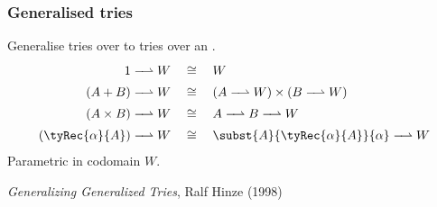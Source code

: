 \begin{frame}
\frametitle{Generalised tries}

Generalise tries over  to tries over an .
\begin{align*}
1 \toFin W
&\quad\cong\quad
W
\\
(A + B) \toFin W
&\quad\cong\quad
(A \toFin W) \times (B \toFin W)
\\
(A \times B) \toFin W
&\quad\cong\quad
A \toFin B \toFin W
\\
(\tyRec{\alpha}{A}) \toFin W
&\quad\cong\quad
\subst{A}{\tyRec{\alpha}{A}}{\alpha} \toFin W
\end{align*}
Parametric in codomain $W$.

\vspace{10pt}
\emph{Generalizing Generalized Tries}, Ralf Hinze (1998)
\end{frame}
